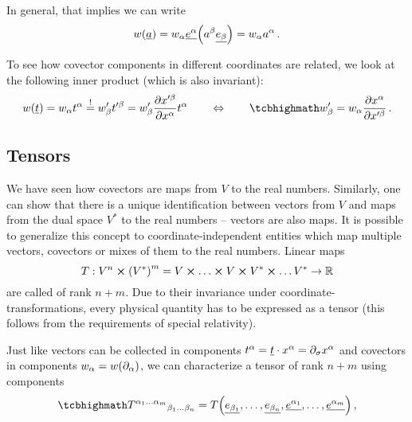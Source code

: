 \documentclass[../relativity_main.tex]{subfiles}
\begin{document}
In general, that implies we can write
\begin{equation}
w\qty(\underline{a}) = w_\alpha \underline{e^\alpha}\qty(a^\beta \underline{e_\beta}) = w_\alpha a^\alpha \, .
\end{equation}


To see how covector components in different coordinates are related, we look at the following inner product (which is also invariant):
\begin{equation}\label{eq:covec_trafo}
w\qty(\fvec{t}) = w_\alpha t^\alpha \overset{!}{=} w'_\beta t'^\beta = w'_\beta \pdv{x'^\beta}{x^\alpha} t^\alpha
\qquad \Leftrightarrow \qquad
\eqbox{
w'_\beta = w_\alpha \pdv{x^\alpha}{x'^\beta}
} \, .
\end{equation}



		\subsection{Tensors}
We have seen how covectors are maps from $V$ to the real numbers. Similarly, one can show that there is a unique identification between vectors from $V$ and maps from the dual space $V^*$ to the real numbers -- vectors are also maps. It is possible to generalize this concept to coordinate-independent entities which map multiple vectors, covectors or mixes of them to the real numbers. Linear maps
\begin{equation}
T: V^n \cross \qty(V^*)^m = V \cross \dots \cross V \cross V^* \cross \dots V^* \rightarrow \mathbb{R}
\end{equation}
are called  of rank $n + m$. Due to their invariance under coordinate-transformations, every physical quantity has to be expressed as a tensor (this follows from the requirements of special relativity).


Just like vectors can be collected in components $t^\alpha = \underline{t} \cdot x^\alpha = \partial_\sigma x^\alpha$ and covectors in components $w_\alpha = w\qty(\partial_\alpha)$, we can characterize a tensor of rank $n + m$ using components
\begin{equation}\label{eq:tensor_comps}
\eqbox{
T^{\alpha_1 \dots \alpha_m}{}_{\beta_1 \dots \beta_n} = T\qty(\fvec{e_{\beta_1}}, \dots, \fvec{e_{\beta_n}}, \fvec{e^{\alpha_1}}, \dots, \fvec{e^{\alpha_m}})
} \, ,
\end{equation}
\end{document}
